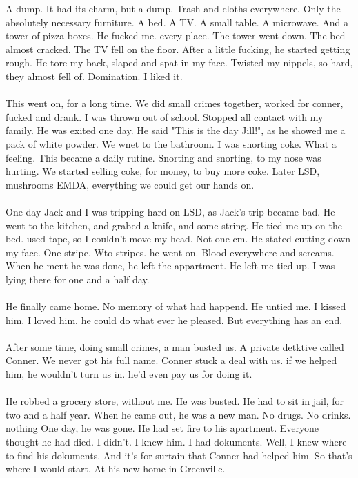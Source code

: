 \documentclass[]{article}
\begin{document}
A dump. It had its charm, but a dump. Trash and cloths everywhere. Only the absolutely necessary furniture. A bed. A TV. A small table. A microwave. And a tower of pizza boxes. He fucked me. every place. The tower went down. The bed almost cracked. The TV fell on the floor. After a little fucking, he started getting rough. He tore my back, slaped and spat in my face. Twisted my nippels, so hard, they almost fell of. Domination. I liked it.
\\ \\
This went on, for a long time. We did small crimes together, worked for conner, fucked and drank. I was thrown out of school. Stopped all contact with my family.  He was exited one day. He said "This is the day Jill!", as he showed me a pack of white powder. We wnet to the bathroom. I was snorting coke. What a feeling. This became a daily rutine. Snorting and snorting, to my nose was hurting. We started selling coke, for money, to buy more coke. Later LSD, mushrooms EMDA, everything we could get our hands on. 
\\ \\
One day Jack and I was tripping hard on LSD, as Jack's trip became bad. He went to the kitchen, and grabed a knife, and some string. He tied me up on the bed. used tape, so I couldn't move my head. Not one cm. He stated cutting down my face. One stripe. Wto stripes. he went on. Blood everywhere and screams. When he ment he was done, he left the appartment. He left me tied up. I was lying there for one and a half day. 
\\ \\
He finally came home. No memory of what had happend. He untied me. I kissed him. I loved him. he could do what ever he pleased. But everything has an end. 
\\ \\
After some time, doing small crimes, a man busted us. A private detktive called Conner. We never got his full name. Conner stuck a deal with us. if we helped him, he wouldn't turn us in. he'd even pay us for doing it.
\\ \\
He robbed a grocery store, without me. He was busted. He had to sit in jail, for two and a half year. When he came out, he was a new man. No drugs. No drinks. nothing One day, he was gone. He had set fire to his apartment. Everyone thought he had died. I didn't. I knew him. I had dokuments. Well, I knew where to find his dokuments. And it's for surtain that Conner had helped him. So that's where I would start. At his new home in Greenville.
\end{document}
